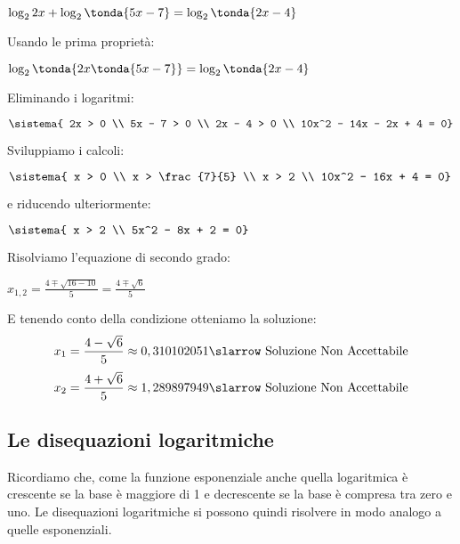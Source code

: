 \begin{esempio}
 \(\log_2{2x} + \log_2\tonda{5x -7} = \log_2\tonda{2x -4}\)
 
Usando le prima proprietà:

\(\log_2\tonda{2x \tonda{5x -7}}= \log_2\tonda{2x -4}\)
  
Eliminando i logaritmi:

\(\sistema{
2x > 0 \\
5x - 7 > 0 \\
2x - 4 > 0 \\
10x^2 - 14x - 2x + 4 = 0}\)

Sviluppiamo i calcoli:

\(\sistema{
x > 0 \\
x > \frac{7}{5} \\
x > 2 \\
10x^2 - 16x + 4 = 0}\)

e riducendo ulteriormente:

\(\sistema{
x > 2 \\
5x^2 - 8x + 2 = 0}\)

Risolviamo l'equazione di secondo grado:

\(x_{1,2} = \frac{4 \mp \sqrt{16-10}}{5} = \frac{4 \mp \sqrt{6}}{5}\)

E tenendo conto della condizione otteniamo la soluzione:
\[x_1 = \frac{4 - \sqrt{6}}{5} \approx 0,310102051 \slarrow
  \text{ Soluzione Non Accettabile} \] 
\[x_2 = \frac{4 + \sqrt{6}}{5} \approx 1,289897949 \slarrow
  \text{ Soluzione Non Accettabile}\]
\end{esempio}


\subsection{Le disequazioni logaritmiche}
\label{subsubsec:esplog_disequazionilogaritmiche}

Ricordiamo che, come la funzione esponenziale anche quella logaritmica è 
crescente se la base è maggiore di 1 e decrescente se la base è compresa tra 
zero e uno.
Le disequazioni logaritmiche si possono quindi risolvere in modo analogo a 
quelle esponenziali.

